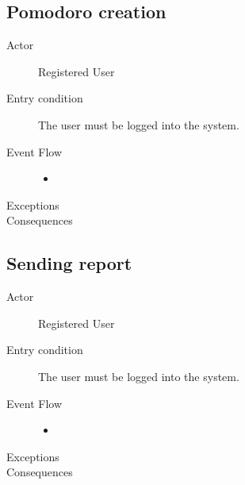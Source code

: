		\subsection{Pomodoro creation}

			\begin{description}

				\item[Actor] Registered User
			
				\item[Entry condition] The user must be logged into the system.

				\item[Event Flow]\hfill

					\begin{itemize}

						\item

					\end{itemize}

				\item[Exceptions]

				\item[Consequences]

			\end{description}

		\subsection{Sending report}

			\begin{description}

				\item[Actor] Registered User
			
				\item[Entry condition] The user must be logged into the system.

				\item[Event Flow]\hfill

					\begin{itemize}

						\item

					\end{itemize}

				\item[Exceptions]

				\item[Consequences]

			\end{description}